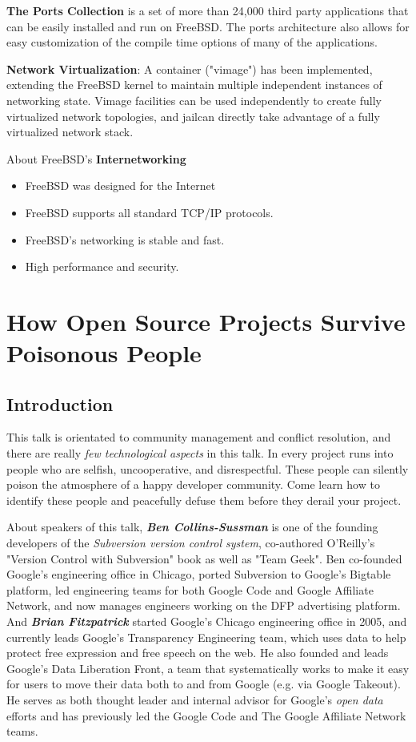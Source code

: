 \documentclass[11pt]{article}
\begin{document}
    \textbf{The Ports Collection }is a set of more than 24,000 third party applications that can be easily installed and run on FreeBSD. The ports architecture also allows for easy customization of the compile time options of many of the applications.
    
    \textbf{Network Virtualization}: A container ("vimage") has been implemented, extending the FreeBSD kernel to maintain multiple independent instances of networking state. Vimage facilities can be used independently to create fully virtualized network topologies, and jailcan directly take advantage of a fully virtualized network stack.

About FreeBSD's \textbf{Internetworking}
\begin{itemize}
	\item FreeBSD was designed for the Internet
	\item FreeBSD supports all standard TCP/IP protocols.	
	\item FreeBSD's networking is stable and fast.
	\item High performance and security.
\end{itemize}


\newpage


\section{How Open Source Projects Survive Poisonous People}

\subsection{Introduction}
This talk is orientated to community management and conflict resolution, and there are really \emph{few technological aspects} in this talk. In every project runs into people who are selfish, uncooperative, and disrespectful. These people can silently poison the atmosphere of a happy developer community. Come learn how to identify these people and peacefully defuse them before they derail your project.

About speakers of this talk, \textbf{\emph{Ben Collins-Sussman}} is one of the founding developers of the \emph{Subversion version control system}, co-authored O'Reilly's "Version Control with Subversion" book as well as "Team Geek". Ben co-founded Google's engineering office in Chicago, ported Subversion to Google's Bigtable platform, led engineering teams for both Google Code and Google Affiliate Network, and now manages engineers working on the DFP advertising platform. And \textbf{\emph{Brian Fitzpatrick} }started Google's Chicago engineering office in 2005, and currently leads Google's Transparency Engineering team, which uses data to help protect free expression and free speech on the web. He also founded and leads Google's Data Liberation Front, a team that systematically works to make it easy for users to move their data both to and from Google (e.g. via Google Takeout). He serves as both thought leader and internal advisor for Google's \emph{open data }efforts and has previously led the Google Code and The Google Affiliate Network teams. 
\end{document}
